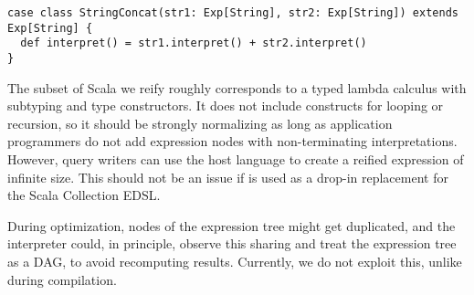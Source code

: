 \begin{lstlisting}
case class StringConcat(str1: Exp[String], str2: Exp[String]) extends Exp[String] {
  def interpret() = str1.interpret() + str2.interpret()
}
\end{lstlisting}

The subset of Scala we reify roughly corresponds to a typed lambda calculus with subtyping and type constructors. It does not include constructs for looping or recursion, so it should be strongly normalizing as long as application programmers do not add expression nodes with non-terminating interpretations. However, query writers can use the host language to create a reified expression of infinite size. This should not be an issue if {\LoS} is used as a drop-in replacement for the Scala Collection EDSL\@.

During optimization, nodes of the expression tree might get duplicated, and the
interpreter could, in principle, observe this sharing and treat the expression
tree as a DAG, to avoid recomputing results. Currently, we do not exploit this,
unlike during compilation.


